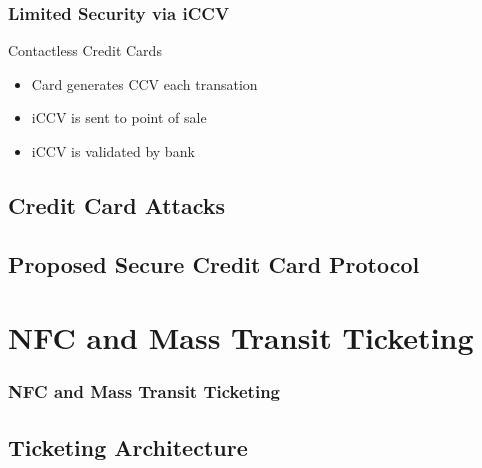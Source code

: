 \documentclass[unknownkeysallowed]{beamer}
\begin{document}
\begin{frame}
\frametitle{Limited Security via iCCV}
  \begin{center}
  \begin{minipage}{.9\textwidth}
  \begin{block}{Contactless Credit Cards}
    \begin{itemize}
      \item{Card generates CCV each transation}
      \item{iCCV is sent to point of sale}
      \item{iCCV is validated by bank}
    \end{itemize}
  \end{block}
  \end{minipage}
  \end{center}
\end{frame}


\subsection{Credit Card Attacks}
\subsection{Proposed Secure Credit Card Protocol}

\section{NFC and Mass Transit Ticketing}
\begin{frame}
\frametitle{NFC and Mass Transit Ticketing}
\begin{center}\begin{minipage}{.9\textwidth}
\tableofcontents[currentsubsection, hideothersubsections, sectionstyle=show/shaded]
\end{minipage}\end{center}
\end{frame}
%

\subsection{Ticketing Architecture}


\end{document}
